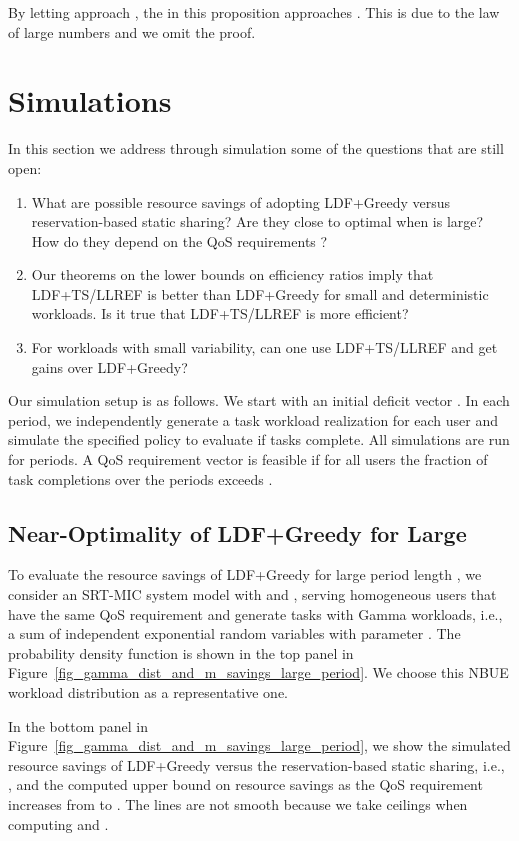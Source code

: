 \documentclass[prodmode,acmtompecs]{acmsmall}
\newcommand{\myComments}[1]{}
\newif\ifdissertation
\newcommand{\dissertationStart}{\ifdissertation  \myComments{Dissertation version: }}
\newcommand{\commentEnd}{\myComments{End}}
\begin{document}
By letting  approach , the  in this proposition approaches . This is due to the law of large numbers and we omit the proof.  
\commentEnd\fi

\section{Simulations}
In this section we address through simulation some of the questions that are still open: 
\begin{enumerate}
\item What are possible resource savings of adopting LDF+Greedy versus reservation-based static sharing? 
		Are they close to optimal when  is large? 
		How do they depend on the QoS requirements ? 
\item Our theorems on the lower bounds on efficiency ratios imply that LDF+TS/LLREF is better than LDF+Greedy for small  and deterministic workloads. Is it true that LDF+TS/LLREF is more efficient? 
\item For workloads with small variability, can one use LDF+TS/LLREF and get gains over LDF+Greedy?  
\end{enumerate}

Our simulation setup is as follows. We start with an initial deficit vector . In each period, we independently generate a task workload realization for each user and simulate the specified policy to evaluate if tasks complete. All simulations are run for  periods. A QoS requirement vector  is feasible if for all users  the fraction of task completions over the  periods exceeds . 

\subsection{Near-Optimality of LDF+Greedy for Large }
\dissertationStart
LDF+Greedy is simple to implement in practice since it does not require knowledge of workload distribution or the task preemption and migration. 
\commentEnd\fi
To evaluate the resource savings of LDF+Greedy for large period length , we consider an SRT-MIC system model with  and , serving homogeneous users that have the same QoS requirement  and generate tasks with Gamma workloads, i.e., a sum of  independent exponential random variables with parameter . 
The probability density function is shown in the top panel in Figure~{\ref{fig_gamma_dist_and_m_savings_large_period}}. We choose this NBUE workload distribution as a representative one. 

In the bottom panel in Figure~{\ref{fig_gamma_dist_and_m_savings_large_period}}, 
we show the simulated resource savings of LDF+Greedy versus the reservation-based static sharing, i.e., , and the computed upper bound on resource savings  as the QoS requirement  increases from  to . 
The lines are not smooth because we take ceilings when computing  and . 
\end{document}
